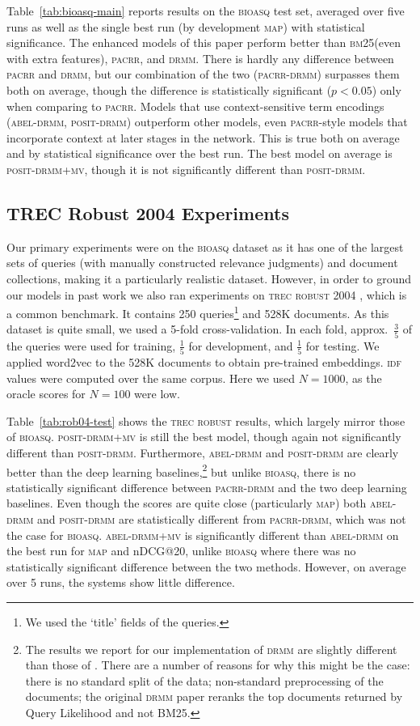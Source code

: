\documentclass[11pt,a4paper]{article}
\newcommand{\bioasq}{\textsc{bioasq}\xspace}
\newcommand{\trecrob}{\textsc{trec robust}\xspace}
\newcommand{\drmm}{\textsc{drmm}\xspace}
\newcommand{\pacrr}{\textsc{pacrr}\xspace}
\newcommand{\pacrrdrmm}{\textsc{pacrr-drmm}\xspace}
\newcommand{\abeldrmm}{\textsc{abel-drmm}\xspace}
\newcommand{\abeldrmmmv}{\textsc{abel-drmm+mv}\xspace}
\newcommand{\positdrmm}{\textsc{posit-drmm}\xspace}
\newcommand{\positdrmmmv}{\textsc{posit-drmm+mv}\xspace}
\newcommand{\bmtf}{\textsc{bm25}\xspace}
\newcommand{\idf}{\textsc{idf}\xspace}
\newcommand{\map}{\textsc{map}\xspace}
\begin{document}
Table~\ref{tab:bioasq-main} reports results on the \bioasq test set, averaged over five runs as well as the single best run (by development \map) with statistical significance. 
The enhanced models of this paper perform better than \bmtf (even with extra features), \pacrr, and \drmm. There is hardly any difference between \pacrr and \drmm, but our combination of the two (\pacrrdrmm) surpasses them both on average, 
though the difference is statistically significant ($p < 0.05$) only when comparing to \pacrr. 
Models that use context-sensitive term encodings (\abeldrmm, \positdrmm) outperform other models, even \pacrr-style models that incorporate context at later stages in the network. This is true both on average and by statistical significance over the best run. The best model on average is \positdrmmmv, though it is not significantly different than \positdrmm.


\subsection{TREC Robust 2004 Experiments}

Our primary experiments were on the \bioasq 
dataset as it has one of the largest 
sets of queries (with manually constructed relevance judgments) and document collections, making it 
a particularly realistic dataset. However, in order to ground our models in past work we also ran experiments on \trecrob 2004 \cite{voorhees2005trec}, which is a common benchmark. It contains 250 
queries\footnote{We used the `title' fields of the queries.}
and 528K documents. As this dataset is quite small, we used a 5-fold cross-validation. In each fold, approx.\ $\frac{3}{5}$ of the queries were used for training, $\frac{1}{5}$ for development, and $\frac{1}{5}$  for testing. We applied word2vec to the 528K documents to obtain pre-trained embeddings. \idf values were computed over the same corpus. Here we used $N=1000$, as the oracle scores for $N=100$ were low.

Table~\ref{tab:rob04-test} shows the \trecrob results, which largely mirror those of \bioasq. \positdrmmmv is still the best model, though again not significantly 
different than \positdrmm. Furthermore, \abeldrmm and \positdrmm are clearly better than the deep learning baselines,\footnote{The results we report for our implementation of \drmm are slightly different than 
those of . There are a number of reasons for why this might be the case: there is no standard split of the data; non-standard preprocessing of the documents; the original \drmm paper reranks the top documents returned by Query Likelihood and not BM25.} 
but unlike \bioasq, 
there is no statistically significant difference between \pacrrdrmm and the two deep learning baselines.
Even though the scores are quite close (particularly \map) both \abeldrmm and \positdrmm are statistically different from \pacrrdrmm, which was not the case for \bioasq.
\abeldrmmmv is significantly 
different than \abeldrmm on the best run for \map and nDCG@20, unlike \bioasq where there was no 
statistically significant difference between the 
two methods. However, on average over 5 runs, the systems show little difference.
\end{document}
